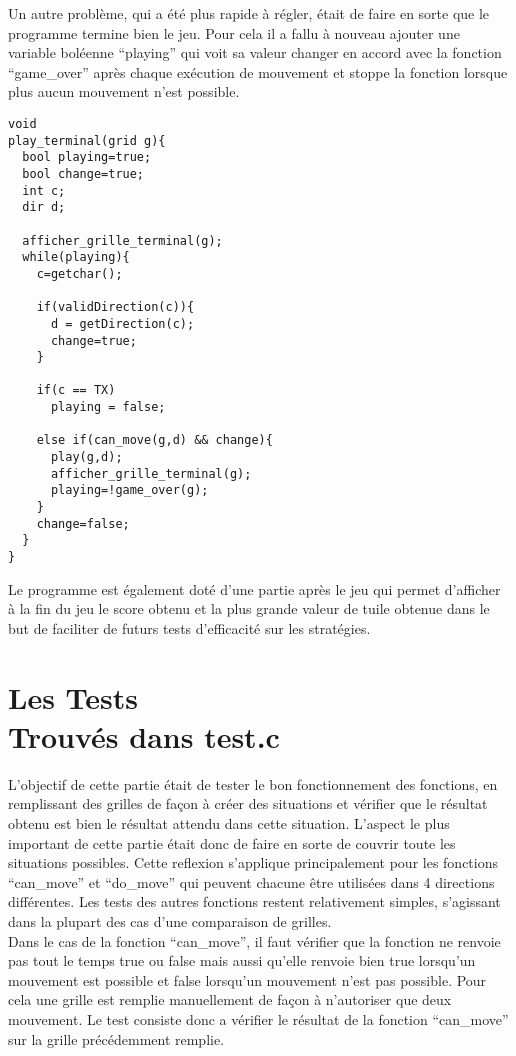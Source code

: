 \documentclass[12pt]{article}
\begin{document}
Un autre problème, qui a été plus rapide à régler, était de faire en sorte que le programme termine bien le jeu. Pour cela il a fallu à nouveau ajouter une variable boléenne ``playing'' qui voit sa valeur changer en accord avec la fonction ``game\_over'' après chaque exécution de mouvement et stoppe la fonction lorsque plus aucun mouvement n'est possible.\\
\begin{verbatim}
void
play_terminal(grid g){
  bool playing=true;
  bool change=true;
  int c;
  dir d;

  afficher_grille_terminal(g);
  while(playing){
    c=getchar();

    if(validDirection(c)){
      d = getDirection(c);
      change=true;
    }
    
    if(c == TX)
      playing = false;
    
    else if(can_move(g,d) && change){
      play(g,d);
      afficher_grille_terminal(g);
      playing=!game_over(g);
    }
    change=false;
  }  
}
\end{verbatim}
Le programme est également doté d'une partie après le jeu qui permet d'afficher à la fin du jeu le score obtenu et la plus grande valeur de tuile obtenue dans le but de faciliter de futurs tests d'efficacité sur les stratégies.

\section{Les Tests
\\{\small Trouvés dans test.c}}

L'objectif de cette partie était de tester le bon fonctionnement des fonctions, en remplissant des grilles de façon à créer des situations et vérifier que le résultat obtenu est bien le résultat attendu dans cette situation. L'aspect le plus important de cette partie était donc de faire en sorte de couvrir toute les situations possibles. Cette reflexion s'applique principalement pour les fonctions ``can\_move'' et ``do\_move'' qui peuvent chacune être utilisées dans 4 directions différentes. Les tests des autres fonctions restent relativement simples, s'agissant dans la plupart des cas d'une comparaison de grilles.\\

Dans le cas de la fonction ``can\_move'', il faut vérifier que la fonction ne renvoie pas tout le temps true ou false mais aussi qu'elle renvoie bien true lorsqu'un mouvement est possible et false lorsqu'un mouvement n'est pas possible. Pour cela une grille est remplie manuellement de façon à n'autoriser que deux mouvement. Le test consiste donc a vérifier le résultat de la fonction ``can\_move'' sur la grille précédemment remplie.\\
\end{document}
